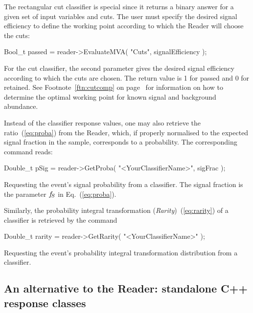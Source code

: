 The rectangular cut classifier is special since it returns a binary answer for a given 
set of input variables and cuts. The user must specify the desired signal efficiency
to define the working point according to which the Reader will choose the cuts:
\begin{codeexample}
\begin{tmvacode}
Bool_t passed = reader->EvaluateMVA( "Cuts", signalEfficiency );
\end{tmvacode}
\caption[.]{\codeexampleCaptionSize For the cut classifier, the second parameter 
            gives the desired signal efficiency according to which the cuts 
            are chosen. The return value is 1 for passed and 0 for retained. 
            See Footnote~\ref{ftn:cutcomp} on page~\pageref{ftn:cutcomp} for 
            information on how to determine the optimal working point for 
            known signal and background abundance.}
\end{codeexample}

Instead of the classifier response values, one may also retrieve the ratio~(\ref{eq:proba})
from the Reader, which, if properly normalised to the expected signal fraction 
in the sample, corresponds to a probability. The corresponding command
reads:
\begin{codeexample}
\begin{tmvacode}
Double_t pSig = reader->GetProba( "<YourClassifierName>", sigFrac );
\end{tmvacode}
\caption[.]{\codeexampleCaptionSize Requesting the event's signal probability from a 
            classifier. The signal fraction is the parameter $ f_{\!S}$ in Eq.~(\ref{eq:proba}).}
\end{codeexample}
Similarly, the probability integral transformation ({\em Rarity})~(\ref{eq:rarity}) of a classifier is retrieved by the 
command
\begin{codeexample}
\begin{tmvacode}
Double_t rarity = reader->GetRarity( "<YourClassifierName>" );
\end{tmvacode}
\caption[.]{\codeexampleCaptionSize Requesting the event's probability integral transformation distribution from a 
            classifier. }
\end{codeexample}

\subsection{An alternative to the Reader: standalone C++ response classes
           }
\label{sec:usingtmva:standaloneClasses}


